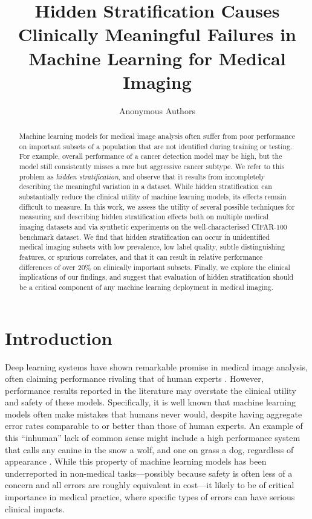 \documentclass{article}
\title{Hidden Stratification Causes Clinically Meaningful Failures in Machine Learning for Medical Imaging
}
\author{%
Anonymous Authors
}
\begin{document}
\maketitle

\begin{abstract}
Machine learning models for medical image analysis often suffer from poor performance on important subsets of a population that are not identified during training or testing.
For example, overall performance of a cancer detection model may be high, but the model still consistently misses a rare but aggressive cancer subtype.    
We refer to this problem as \textit{hidden stratification}, and observe that it results from incompletely describing the meaningful variation in a dataset.
While hidden stratification can substantially reduce the clinical utility of machine learning models, its effects remain difficult to measure.
In this work, we assess the utility of several possible techniques for measuring and describing hidden stratification effects both on multiple medical imaging datasets and via synthetic experiments on the well-characterised CIFAR-100 benchmark dataset.
We find that hidden stratification can occur in unidentified medical imaging subsets with low prevalence, low label quality, subtle distinguishing features, or spurious correlates, and that it can result in relative performance differences of over 20\% on clinically important subsets.
Finally, we explore the clinical implications of our findings, and suggest that evaluation of hidden stratification should be a critical component of any machine learning deployment in medical imaging.

\end{abstract}

\section{Introduction}

Deep learning systems have shown remarkable promise in medical image analysis, often claiming performance rivaling that of human experts \citep{esteva2019guide}. 
 However, performance results reported in the literature may overstate the clinical utility and safety of these models.  
 Specifically, it is well known that machine learning models often make mistakes that humans never would, despite having aggregate error rates comparable to or better than those of human experts. An example of this ``inhuman'' lack of common sense might include a high performance system that calls any canine in the snow a wolf, and one on grass a dog, regardless of appearance \citep{ribeiro2016should}.
While this property of machine learning models has been underreported in non-medical tasks---possibly because safety is often less of a concern and all errors are roughly equivalent in cost---it likely to be of critical importance in medical practice, where specific types of errors can have serious clinical impacts. 
 
\end{document}
